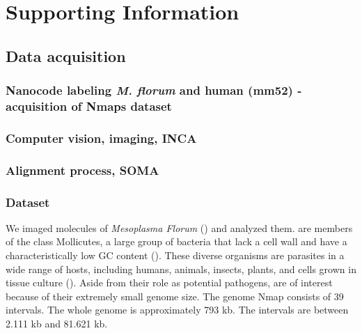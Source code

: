 \section{Supporting Information} \label{Sec7}

\subsection{Data acquisition}
\subsubsection{Nanocode labeling {\emph{M. florum}} and human (mm52) - acquisition of Nmaps dataset} \label{Sec7_Nanocoding}

\subsubsection{Computer vision, imaging, INCA} \label{Sec7_Inca}

\subsubsection{Alignment process, SOMA} \label{Sec7_Soma}

\subsubsection{\mf Dataset} \label{Sec7_MFData}
We imaged molecules of {\emph{Mesoplasma Florum}} (\mf) and analyzed them. \mf are members of the class Mollicutes, a large group of bacteria that lack a cell wall and have a characteristically low GC content (\cite{Razin_etal_1998_MMBR}). These diverse organisms are parasites in a wide range of hosts, including humans, animals, insects, plants, and cells grown in tissue culture (\cite{Razin_etal_1998_MMBR}). Aside from their role as potential pathogens, \mf are of interest because of their extremely small genome size. The \mf genome Nmap consists of 39 intervals. The whole genome is approximately 793 kb. The intervals are between 2.111 kb and 81.621 kb. 

